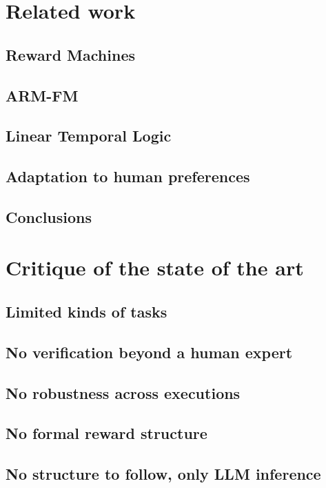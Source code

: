 \documentclass[11pt,english,listoffigures,listoftables, listofalgorithms]{tfgetsinf}
\begin{document}
\section{Related work}
\subsection{Reward Machines}
\subsection{ARM-FM}
\subsection{Linear Temporal Logic}
\subsection{Adaptation to human preferences}
\subsection{Conclusions}
\section{Critique of the state of the art}
\subsection{Limited kinds of tasks}
\subsection{No verification beyond a human expert}
\subsection{No robustness across executions}
\subsection{No formal reward structure}
\subsection{No structure to follow, only LLM inference}
\end{document}
